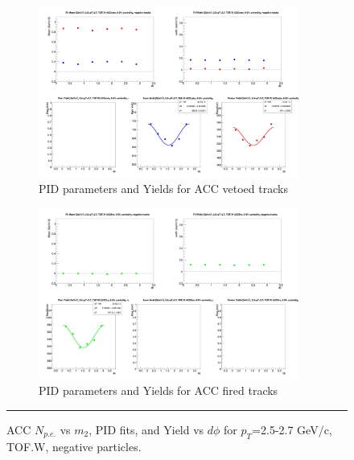 \begin{figure}[H]
  \ContinuedFloat
  \vspace*{-1cm}
    \begin{subfigure}{1\textwidth}
   \centering
   \includegraphics[width=0.94\textwidth]{hiptfits/neg/fitParams_tof2_cent0_ch0_pT-25-27.jpg}
    \caption{PID parameters and Yields for ACC vetoed tracks}
    \end{subfigure}    
    \begin{subfigure}{1\textwidth}
   \centering
   \includegraphics[width=0.94\textwidth]{hiptfits/neg/fitParams_tof3_cent0_ch0_pT-25-27.jpg}
    \caption{PID parameters and Yields for ACC fired tracks}
    \end{subfigure} 
    \rule{35em}{0.5pt}
  \caption[ACC $N_{p.e.}$ vs $m_2$, PID fits, and Yield vs $d\phi$ for $p_T$=2.5-2.7 GeV/c, TOF.W, negative particles.]{ACC $N_{p.e.}$ vs $m_2$, PID fits, and Yield vs $d\phi$ for $p_T$=2.5-2.7 GeV/c, TOF.W, negative particles.}
  \label{fig:acc25-27neg}
\end{figure}

